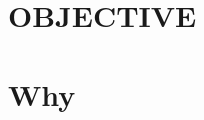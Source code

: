 \documentclass[line,margin]{res}
\begin{document}
\address{chang.liu@elektrobit.com}
\address{Phone: +86 186 1031 6704}

 
\begin{resume}

\section{OBJECTIVE} 
\section{Why} 
 
 
%  
 


 

 


\begin{comment}
\section{COMMUNITY \\ SERVICE}  Organized and directed the 1988 and 1989 Grand 
Marshall Week \newline ``Basketball Marathon.'' A 24 hour 
charity event to benefit the Troy Boys Club. Over 
250 people participated each year. 
\end{comment}

\begin{comment}
\section{EXTRA-CURRICULAR \\ ACTIVITIES}             
Elected {\it House Manager}, Rho Phi Sorority \\
            Elected {\it Sports Chairman} \\
            Attended Krannet Leadership Conference \\
            Headed delegation to Rho Phi Congress \\
            Junior varsity basketball team \\
            Participant, seven intramural athletic teams 
            \end{comment}


\end{resume}
\end{document}
